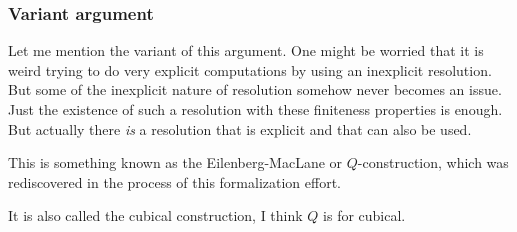 \subsubsection{Variant argument}

Let me mention the variant of this argument. One might be worried that it is weird trying to do very explicit computations by using an inexplicit resolution. But some of the inexplicit nature of resolution somehow never becomes an issue. Just the existence of such a resolution with these finiteness properties is enough. But actually there \emph{is} a resolution that is explicit and that can also be used. 

This is something known as the Eilenberg-MacLane or $Q$-construction, which was rediscovered in the process of this formalization effort.

It is also called the cubical construction, I think $Q$ is for cubical.

